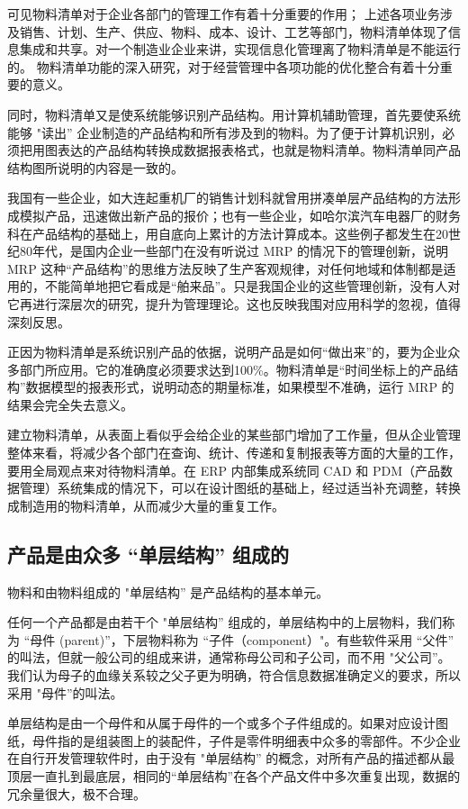     可见物料清单对于企业各部门的管理工作有着十分重要的作用； 上述各项业务涉及销售、计划、生产、供应、物料、成本、设计、工艺等部门，物料清单体现了信息集成和共享。对一个制造业企业来讲，实现信息化管理离了物料清单是不能运行的。 物料清单功能的深入研究，对于经营管理中各项功能的优化整合有着十分重要的意义。

    同时，物料清单又是使系统能够识别产品结构。用计算机辅助管理，首先要使系统能够 "读出” 企业制造的产品结构和所有涉及到的物料。为了便于计算机识别，必须把用图表达的产品结构转换成数据报表格式，也就是物料清单。物料清单同产品结构图所说明的内容是一致的。

    我国有一些企业，如大连起重机厂的销售计划科就曾用拼凑单层产品结构的方法形成模拟产品，迅速做出新产品的报价；也有一些企业，如哈尔滨汽车电器厂的财务科在产品结构的基础上，用自底向上累计的方法计算成本。这些例子都发生在20世纪80年代，是国内企业一些部门在没有听说过 MRP 的情况下的管理创新，说明 MRP 这种“产品结构”的思维方法反映了生产客观规律，对任何地域和体制都是适用的，不能简单地把它看成是“舶来品”。只是我国企业的这些管理创新，没有人对它再进行深层次的研究，提升为管理理论。这也反映我围对应用科学的忽视，值得深刻反思。

    正因为物料清单是系统识别产品的依据，说明产品是如何“做出来”的，要为企业众多部门所应用。它的准确度必须要求达到100\%。物料清单是“时间坐标上的产品结构”数据模型的报表形式，说明动态的期量标准，如果模型不准确，运行 MRP 的结果会完全失去意义。

    建立物料清单，从表面上看似乎会给企业的某些部门增加了工作量，但从企业管理整体来看，将减少各个部门在查询、统计、传递和复制报表等方面的大量的工作，要用全局观点来对待物料清单。在 ERP 内部集成系统同 CAD 和 PDM（产品数据管理）系统集成的情况下，可以在设计图纸的基础上，经过适当补充调整，转换成制造用的物料清单，从而减少大量的重复工作。

\subsection {产品是由众多 “单层结构” 组成的}

    物料和由物料组成的 "单层结构” 是产品结构的基本单元。

    任何一个产品都是由若干个 "单层结构” 组成的，单层结构中的上层物料，我们称为 “母件 (parent)”，下层物料称为 “子件（component）"。有些软件采用 “父件” 的叫法，但就一般公司的组成来讲，通常称母公司和子公司，而不用 "父公司”。我们认为母子的血缘关系较之父子更为明确，符合信息数据准确定义的要求，所以采用 "母件”的叫法。

    单层结构是由一个母件和从属于母件的一个或多个子件组成的。如果对应设计图纸，母件指的是组装图上的装配件，子件是零件明细表中众多的零部件。不少企业在自行开发管理软件时，由于没有 "单层结构” 的概念，对所有产品的描述都从最顶层一直扎到最底层，相同的“单层结构”在各个产品文件中多次重复出现，数据的冗余量很大，极不合理。

